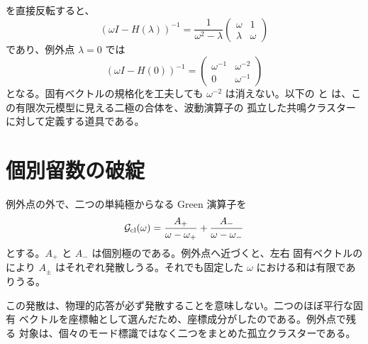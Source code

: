 を直接反転すると、
\begin{equation}
\left(\omega I-H(\lambda)\right)^{-1}
=
\frac{1}{\omega^2-\lambda}
\begin{pmatrix}
\omega&1\\
\lambda&\omega
\end{pmatrix}
\label{eq:ep-two-by-two-resolvent}
\end{equation}
であり、例外点 $\lambda=0$ では
\begin{equation}
\left(\omega I-H(0)\right)^{-1}
=
\begin{pmatrix}
\omega^{-1}&\omega^{-2}\\
0&\omega^{-1}
\end{pmatrix}
\label{eq:ep-two-by-two-double-pole}
\end{equation}
となる。固有ベクトルの規格化を工夫しても $\omega^{-2}$ は消えない。以下の  と は、この有限次元模型に見える二極の合体を、波動演算子の
孤立した共鳴クラスターに対して定義する道具である。

\section{個別留数の破綻}

例外点の外で、二つの単純極からなる Green 演算子を
\begin{equation}
\mathcal{G}_{\mathrm{cl}}(\omega)
=
\frac{A_+}{\omega-\omega_+}
+\frac{A_-}{\omega-\omega_-}
\label{eq:two-simple-poles}
\end{equation}
とする。$A_+$ と $A_-$ は個別極のである。例外点へ近づくと、左右
固有ベクトルのにより $A_\pm$ はそれぞれ発散しうる。それでも固定した
$\omega$ における和は有限でありうる。

この発散は、物理的応答が必ず発散することを意味しない。二つのほぼ平行な固有
ベクトルを座標軸として選んだため、座標成分がしたのである。例外点で残る
対象は、個々のモード標識ではなく二つをまとめた孤立クラスターである。

\section{}

